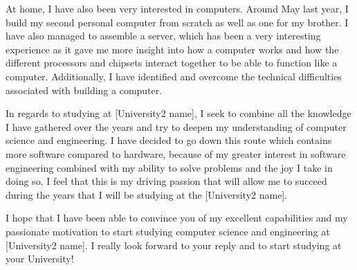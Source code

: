 At home, I have also been very interested in computers. Around May last year, I build my second personal computer from scratch as well as one for my brother. I have also managed to assemble a server, which has been a very interesting experience as it gave me more insight into how a computer works and how the different processors and chipsets interact together to be able to function like a computer. Additionally, I have identified and overcome the technical difficulties associated with building a computer.

In regards to studying at [University2 name], I seek to combine all the knowledge I have gathered over the years and try to deepen my understanding of computer science and engineering. I have decided to go down this route which contains more software compared to hardware, because of my greater interest in software engineering combined with my ability to solve problems and the joy I take in doing so. I feel that this is my driving passion that will allow me to succeed during the years that I will be studying at the [University2 name].

I hope that I have been able to convince you of my excellent capabilities and my passionate motivation to start studying computer science and engineering at [University2 name]. I really look forward to your reply and to start studying at your University!


